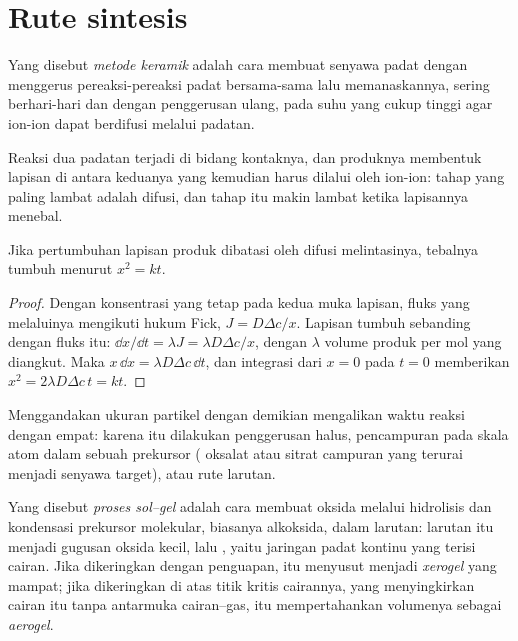 \section{Rute sintesis}

\begin{definition}\label{def:b3:inorganic-materials:ceramic-method}
Yang disebut \emph{metode keramik} adalah cara membuat senyawa padat dengan
menggerus pereaksi-pereaksi padat bersama-sama lalu memanaskannya, sering berhari-hari dan
dengan penggerusan ulang, pada suhu yang cukup tinggi agar ion-ion dapat berdifusi melalui
padatan.
\end{definition}

Reaksi dua padatan terjadi di bidang kontaknya, dan produknya membentuk
lapisan di antara keduanya yang kemudian harus dilalui oleh ion-ion: tahap yang paling lambat
adalah difusi, dan tahap itu makin lambat ketika lapisannya menebal.

\begin{proposition}\label{prop:b3:inorganic-materials:parabolic}
Jika pertumbuhan lapisan produk dibatasi oleh difusi melintasinya, tebalnya
tumbuh menurut $x^2 = kt$.
\end{proposition}

\begin{proof}
Dengan konsentrasi yang tetap pada kedua muka lapisan, fluks yang melaluinya
mengikuti hukum Fick, $J = D\Delta c/x$. Lapisan tumbuh sebanding dengan fluks itu:
$\dd x/\dd t = \lambda J = \lambda D\Delta c/x$, dengan $\lambda$ volume produk per mol yang diangkut. Maka
$x\,\dd x = \lambda D\Delta c\,\dd t$, dan integrasi dari $x = 0$ pada $t = 0$ memberikan $x^2 = 2\lambda D\Delta c\,t = kt$.
\end{proof}

Menggandakan ukuran partikel dengan demikian mengalikan waktu reaksi dengan empat: karena itu
dilakukan penggerusan halus, pencampuran pada skala atom dalam sebuah prekursor ( oksalat
atau sitrat campuran yang terurai menjadi senyawa target), atau rute larutan.

\begin{definition}\label{def:b3:inorganic-materials:sol-gel}
Yang disebut \emph{proses sol--gel} adalah cara membuat oksida melalui
hidrolisis dan kondensasi prekursor molekular, biasanya alkoksida, dalam
larutan: larutan itu menjadi  gugusan oksida kecil, lalu , yaitu
jaringan padat kontinu yang terisi cairan. Jika dikeringkan dengan penguapan,  itu
menyusut menjadi \emph{xerogel} yang mampat; jika dikeringkan di atas titik
kritis cairannya, yang menyingkirkan cairan itu tanpa antarmuka cairan--gas,  itu mempertahankan
volumenya sebagai \emph{aerogel}.
\end{definition}

